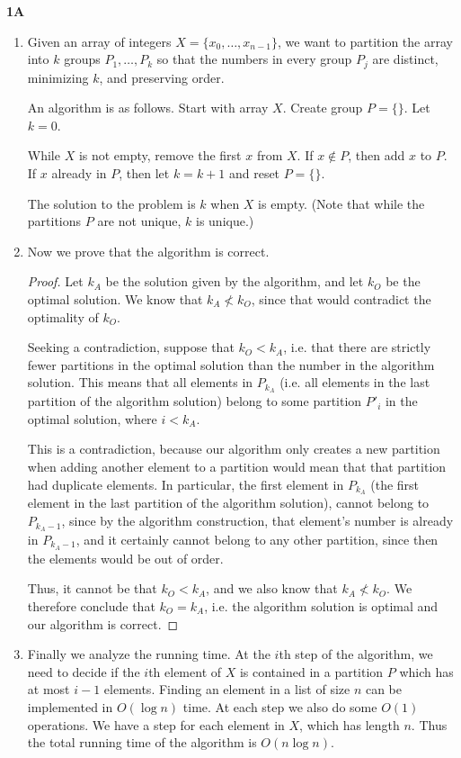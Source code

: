 \documentclass[11pt]{article}
\begin{document}
\textbf{1A}

\begin{enumerate}
\item Given an array of integers $X = \{x_0, \dots, x_{n-1}\}$, we want to partition the array into $k$ groups $P_1, \dots, P_k$ so that the numbers in every group $P_j$ are distinct, minimizing $k$, and preserving order. 

An algorithm is as follows. Start with array $X$. Create group $P = \{ \}$. Let $k = 0$. 

While $X$ is not empty, remove the first $x$ from $X$. If $x \notin P$, then add $x$ to $P$. If $x$ already in $P$, then let $k = k+1$ and reset $P = \{ \}$. 

The solution to the problem is $k$ when $X$ is empty. (Note that while the partitions $P$ are not unique, $k$ is unique.)

\item Now we prove that the algorithm is correct. 
\begin{proof}
Let $k_A$ be the solution given by the algorithm, and let $k_O$ be the optimal solution. We know that $k_A \not< k_O$, since that would contradict the optimality of $k_O$. 

Seeking a contradiction, suppose that $k_O < k_A$, i.e. that there are strictly fewer partitions in the optimal solution than the number in the algorithm solution. This means that all elements in $P_{k_A}$ (i.e. all elements in the last partition of the algorithm solution) belong to some partition $P'_{i}$ in the optimal solution, where $i < k_A$. 

This is a contradiction, because our algorithm only creates a new partition when adding another element to a partition would mean that that partition had duplicate elements. In particular, the first element in $P_{k_A}$ (the first element in the last partition of the algorithm solution), cannot belong to $P_{k_A-1}$, since by the algorithm construction, that element's number is already in $P_{k_A-1}$, and it certainly cannot belong to any other partition, since then the elements would be out of order. 

Thus, it cannot be that $k_O<k_A$, and we also know that $k_A \not < k_O$. We therefore conclude that $k_O = k_A$, i.e. the algorithm solution is optimal and our algorithm is correct.
\end{proof}
\item Finally we analyze the running time. At the $i$th step of the algorithm, we need to decide if the $i$th element of $X$ is contained in a partition $P$ which has at most $i-1$ elements. Finding an element in a list of size $n$ can be implemented in $O(\log n)$ time. At each step we also do some $O(1)$ operations. We have a step for each element in $X$, which has length $n$. Thus the total running time of the algorithm is $O(n\log n)$. 
\end{enumerate}
\end{document}
